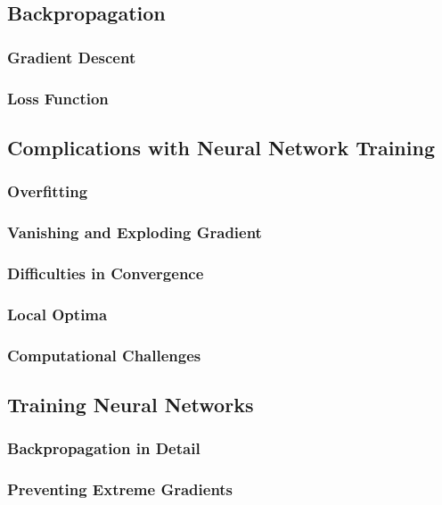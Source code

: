 \documentclass[titlepage]{article}
\begin{document}
\newpage

\subsection{Backpropagation}
\subsubsection{Gradient Descent}
\subsubsection{Loss Function}

\newpage

\subsection{Complications with Neural Network Training}
\subsubsection{Overfitting}
\subsubsection{Vanishing and Exploding Gradient}
\subsubsection{Difficulties in Convergence}
\subsubsection{Local Optima}
\subsubsection{Computational Challenges}

\newpage

\subsection{Training Neural Networks}
\subsubsection{Backpropagation in Detail}
\subsubsection{Preventing Extreme Gradients}
\end{document}
